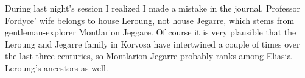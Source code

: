 During last night's session I realized I made a mistake in the journal. Professor Fordyce' wife belongs to house Leroung, not house Jegarre, which stems from gentleman-explorer Montlarion Jeggare. Of course it is very plausible that the Leroung and Jegarre family in Korvosa have intertwined a couple of times over the last three centuries, so Montlarion Jegarre probably ranks among Eliasia Leroung's ancestors as well.\\

